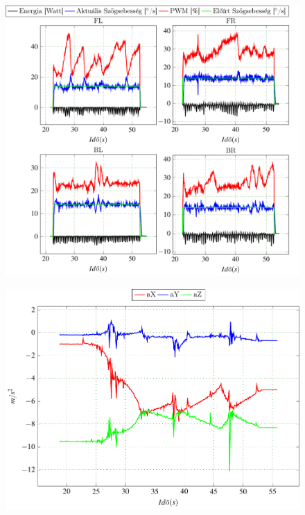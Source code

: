 \begin{figure}[H]
  \includegraphics{tikz/LepcsoFelxx.pdf}
  \caption{}
  \label{fig:LepcsoFelxx}
\end{figure}

\begin{figure}[H]
  \includegraphics{tikz/ImuLepcsoFel1.pdf}
  \caption{}
  \label{fig:ImuLepcsoFel1}
\end{figure}













